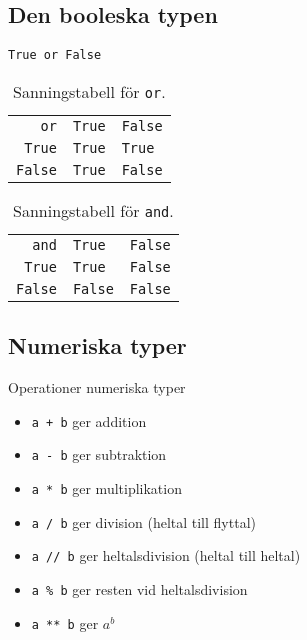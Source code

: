 \subsection{Den booleska typen}

\begin{frame}
  \begin{center}
    \lstinline[basicstyle=\Large]{True or False}
  \end{center}
\end{frame}

\begin{frame}
  \begin{table}
    \begin{tabular}{rll}
      \lstinline$or$ & \lstinline$True$ & \lstinline$False$ \\
      \lstinline$True$ & \lstinline$True$ & \lstinline$True$ \\
      \lstinline$False$ & \lstinline$True$ & \lstinline$False$
    \end{tabular}
    \caption{Sanningstabell för \lstinline{or}.}
  \end{table}

  \pause

  \begin{table}
    \begin{tabular}{rll}
      \lstinline$and$ & \lstinline$True$ & \lstinline$False$ \\
      \lstinline$True$ & \lstinline$True$ & \lstinline$False$ \\
      \lstinline$False$ & \lstinline$False$ & \lstinline$False$
    \end{tabular}
    \caption{Sanningstabell för \lstinline{and}.}
  \end{table}
\end{frame}


\subsection{Numeriska typer}

\begin{frame}[fragile]
  \begin{block}{Operationer numeriska typer}
    \begin{itemize}
      \item \lstinline{a + b} ger addition
      \item \lstinline{a - b} ger subtraktion
      \item \lstinline{a * b} ger multiplikation
      \item \lstinline{a / b} ger division (heltal till flyttal)
      \item \lstinline{a // b} ger heltalsdivision (heltal till heltal)
      \item \lstinline{a % b} ger resten vid heltalsdivision
      \item \lstinline{a ** b} ger \(a^b\)
    \end{itemize}
  \end{block}
\end{frame}

